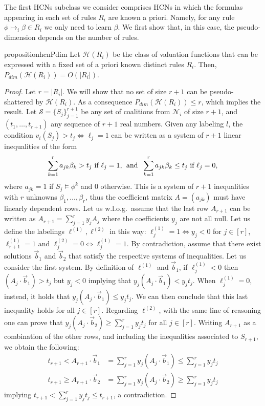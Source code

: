 \documentclass[letterpaper]{article} %
\newcommand{\modulus}[1]{\vert #1 \vert}
\newcommand{\hclass}{\ensuremath{\mathcal{H}}}
\newcommand{\sample}{\ensuremath{\mathcal{S}}}
\begin{document}
The first HCNs subclass we consider comprises HCNs in which the formulas appearing in each set of rules $R_i$ are known a priori. Namely, for any rule $\phi \mapsto_i \beta \in R_i$ we only need to learn $\beta$.
We first show that, in this case, the pseudo-dimension depends on the number of rules.
\begin{restatable}{proposition}{hcnPdim}\label{lem:hcn_pdim}
Let $\hclass(R_i)$ be the class of valuation functions that can be expressed with a fixed set of a priori known distinct rules $R_i$. Then,
$P_{dim}\left(\hclass(R_i)\right) = O\left(\modulus{R_i}\right)$.
\end{restatable}
\begin{proof}
Let $r=\modulus{R_i}$. We will show that no set of size $r+1$ can be pseudo-shattered by $\hclass(R_i)$. As a consequence $P_{dim}\left(\hclass(R_i)\right) \leq r$, which implies the result.
Let $\sample = \{S_j\}_{j=1}^{r+1}$ be any set of coalitions from $\mathcal{N}_i$ of size $r+1$, and $(t_1, \ldots, t_{r+1})$ any sequence of $r+1$ real numbers. Given any labeling $l$, the condition $v_i(S_j) > t_j \Leftrightarrow \ell_j = 1$ can be written as a system of $r+1$ linear inequalities of the form
\[
    \sum_{k=1}^r a_{jk} \beta_k > t_j \text{ if } \ell_j=1 \text{,\; and \;}
    \sum_{k=1}^r a_{jk} \beta_k \leq t_j \text{ if } \ell_j=0,
\]
where $a_{jk}= 1$ if $S_j \models \phi^k$ and $0$ otherwise.
This is a system of $r+1$ inequalities with $r$ unknowns $\beta_1,\dots, \beta_r$, thus the coefficient matrix $A=(a_{jk})$ must have linearly dependent rows. Let us w.l.o.g.\ assume that the last row $A_{r+1}$ can be written as $A_{r+1} = \sum_{j=1}^r y_j A_j$ where the coefficients $y_j$ are not all null.
Let us define the labelings $\ell^{(1)}, \ell^{(2)}$ in this way: $\ell^{(1)}_j = 1 \Leftrightarrow y_j<0$ for $j\in[r]$, $\ell^{(1)}_{r+1}=1$ and $\ell^{(2)}_j = 0 \Leftrightarrow \ell^{(1)}_j =1$.
By contradiction, assume that there exist solutions $\vec{b}_1$ and $\vec{b}_2$ that satisfy the respective systems of inequalities. Let us consider the first system. By definition of $\ell^{(1)}$ and $\vec{b}_1$, if $\ell^{(1)}_j < 0$ then $\left(A_j \cdot \vec{b}_1\right)> t_j$ but $y_j <0$ implying that $y_j \left(A_j \cdot \vec{b}_1\right) < y_j t_j$. When $\ell^{(1)}_j = 0$, instead, it holds that $y_j \left(A_j \cdot \vec{b}_1\right) \leq y_j t_j$. We can then conclude that this last inequality holds for all $j \in [r]$. Regarding $\ell^{(2)}$, with the same line of reasoning one can prove that $y_j \left(A_j \cdot \vec{b}_2\right) \geq \sum_{j=1}^r y_j t_j$ for all $j \in [r]$. Writing $A_{r+1}$ as a combination of the other rows, and including the inequalities associated to $S_{r+1}$, we obtain the following:
\begin{align*}
    t_{r+1} < A_{r+1} \cdot \vec{b}_1 &= \sum_{j=1}^r y_j \left(A_j \cdot \vec{b}_1\right) \leq \sum_{j=1}^r y_j t_j\\
    t_{r+1} \geq A_{r+1} \cdot \vec{b}_2 &= \sum_{j=1}^r y_j \left(A_j \cdot \vec{b}_2\right) \geq \sum_{j=1}^r y_j t_j
\end{align*}
implying $t_{r+1} < \sum_{j=1}^r y_j t_j \le t_{r+1}$, a contradiction.
\end{proof}
\end{document}
